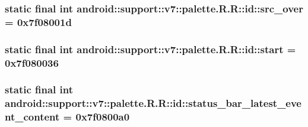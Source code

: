 \hypertarget{classandroid_1_1support_1_1v7_1_1palette_1_1_r_1_1id_4760835c7d60a873899833f64d58a4f5}{
\subsubsection[{src\_\-over}]{\setlength{\rightskip}{0pt plus 5cm}static final int android::support::v7::palette.R.R::id::src\_\-over = 0x7f08001d}}
\label{classandroid_1_1support_1_1v7_1_1palette_1_1_r_1_1id_4760835c7d60a873899833f64d58a4f5}


\hypertarget{classandroid_1_1support_1_1v7_1_1palette_1_1_r_1_1id_632b601f237a36bcc6f44fd47f9b9ca2}{
\subsubsection[{start}]{\setlength{\rightskip}{0pt plus 5cm}static final int android::support::v7::palette.R.R::id::start = 0x7f080036}}
\label{classandroid_1_1support_1_1v7_1_1palette_1_1_r_1_1id_632b601f237a36bcc6f44fd47f9b9ca2}


\hypertarget{classandroid_1_1support_1_1v7_1_1palette_1_1_r_1_1id_0781c855cc8b150016b4f20db2d92537}{
\subsubsection[{status\_\-bar\_\-latest\_\-event\_\-content}]{\setlength{\rightskip}{0pt plus 5cm}static final int android::support::v7::palette.R.R::id::status\_\-bar\_\-latest\_\-event\_\-content = 0x7f0800a0}}
\label{classandroid_1_1support_1_1v7_1_1palette_1_1_r_1_1id_0781c855cc8b150016b4f20db2d92537}


